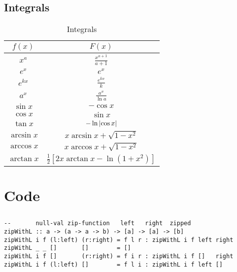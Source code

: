 \subsection{Integrals} 
\begin{table}[h!]
    \centering
    \caption{Integrals}
    \begin{tabular}{|c|c|}
    \hline 
         $f(x)$ & $F(x)$ \\
    \hline 
         $x^a$       & $\frac{x^{a+1}}{a+1}$ \\
         $e^x$       & $e^x$ \\
         $e^{kx}$    & $\frac{e^{kx}}{k}$ \\
         $a^{x}$     & $\frac{a^x}{\ln a}$ \\
         $\sin x$    & $-\cos x$ \\
         $\cos x$    & $\sin x$ \\
         $\tan x$    & $-\ln \abs{\cos x}$ \\
         $\arcsin x$ & $x \arcsin x + \sqrt{1-x^2}$ \\
         $\arccos x$ & $x \arccos x + \sqrt{1-x^2}$ \\
         $\arctan x$ & $\frac{1}{2} \left[2x \arctan x - \ln (1 + x^2)\right]$
         \\ \hline
    \end{tabular}
    \label{tab:integrals}
\end{table}

\section{Code}\label{sec:appcode}
\subsection{}\label{sec:appcodezipwithl}
\begin{codefig}
\begin{verbatim}
--       null-val zip-function   left   right  zipped
zipWithL :: a -> (a -> a -> b) -> [a] -> [a] -> [b]
zipWithL i f (l:left) (r:right) = f l r : zipWithL i f left right
zipWithL _ _ []       []        = []
zipWithL i f []       (r:right) = f i r : zipWithL i f []   right
zipWithL i f (l:left) []        = f l i : zipWithL i f left []
\end{verbatim}
\caption{Extension of . If lists are equal in length  and  are identical. When one list has exhausted their elements,  is used instead.  becomes }
\end{codefig}

